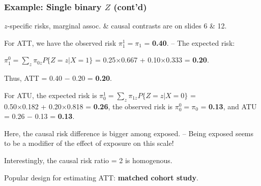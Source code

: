\documentclass[12pt,dvipsnames,t,aspectratio=169, handout%
]{beamer}
\begin{document}
\begin{frame}
\frametitle{\large Example: Single binary $Z$ (cont'd)}

\bi
\item
$z$-specific risks, marginal assoc. \& causal contrasts are on slides 6  \& 12.
\pause
\medskip
\item
For ATT, we have the observed risk $\pi^1_1 = \pi_1$ = \textbf{0.40}. -- The
expected risk:
\begin{center}
$\pi^0_1 = \sum_z \pi_{0z} P\{Z=z|X=1\}$ = 0.25$\times$0.667 + 0.10$\times$0.333 = \textbf{0.20}.
\end{center}
Thus, ATT = 0.40 $-$ 0.20 = \textbf{0.20}.
\pause
\medskip
\item
For ATU, the expected risk is $\pi_0^1 = \sum_z \pi_{1z} P\{ Z=z|X=0\}$ = \\ 0.50$\times$0.182 + 0.20$\times$0.818 = \textbf{0.26},
the observed risk is $\pi_0^0 = \pi_0$ = \textbf{0.13}, and ATU = 0.26 $-$ 0.13 = \textbf{0.13}.
\pause
\medskip
\item 
Here, the causal risk difference is bigger among exposed. --  
Being exposed seems to be a modifier of the effect of exposure on this scale!  
\medskip
\item Interestingly, the causal risk ratio = 2 is  homogenous.
\pause
\medskip
\item[{\bf NB}] 
Popular design for estimating ATT: {\bf matched cohort study}. %
\ei 

\end{frame}

\end{document}
